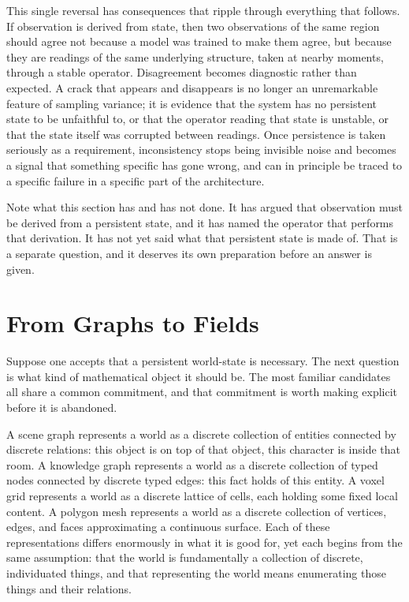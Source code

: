 This single reversal has consequences that ripple through everything that follows. If observation is derived from state, then two observations of the same region should agree not because a model was trained to make them agree, but because they are readings of the same underlying structure, taken at nearby moments, through a stable operator. Disagreement becomes diagnostic rather than expected. A crack that appears and disappears is no longer an unremarkable feature of sampling variance; it is evidence that the system has no persistent state to be unfaithful to, or that the operator reading that state is unstable, or that the state itself was corrupted between readings. Once persistence is taken seriously as a requirement, inconsistency stops being invisible noise and becomes a signal that something specific has gone wrong, and can in principle be traced to a specific failure in a specific part of the architecture.

Note what this section has and has not done. It has argued that observation must be derived from a persistent state, and it has named the operator that performs that derivation. It has not yet said what that persistent state is made of. That is a separate question, and it deserves its own preparation before an answer is given.

\section{From Graphs to Fields}

Suppose one accepts that a persistent world-state is necessary. The next question is what kind of mathematical object it should be. The most familiar candidates all share a common commitment, and that commitment is worth making explicit before it is abandoned.

A scene graph represents a world as a discrete collection of entities connected by discrete relations: this object is on top of that object, this character is inside that room. A knowledge graph represents a world as a discrete collection of typed nodes connected by discrete typed edges: this fact holds of this entity. A voxel grid represents a world as a discrete lattice of cells, each holding some fixed local content. A polygon mesh represents a world as a discrete collection of vertices, edges, and faces approximating a continuous surface. Each of these representations differs enormously in what it is good for, yet each begins from the same assumption: that the world is fundamentally a collection of discrete, individuated things, and that representing the world means enumerating those things and their relations.

